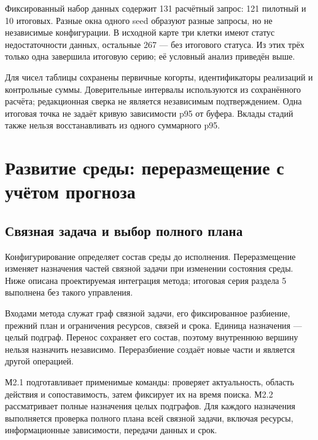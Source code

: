 Фиксированный набор данных содержит 131 расчётный запрос: 121 пилотный и 10 итоговых. Разные окна одного seed образуют разные запросы, но не независимые конфигурации. В исходной карте три клетки имеют статус недостаточности данных, остальные 267 --- без итогового статуса. Из этих трёх только одна завершила итоговую серию; её условный анализ приведён выше.

Для чисел таблицы \hyperlink{fefc-tab:3}{} сохранены первичные когорты, идентификаторы реализаций и контрольные суммы. Доверительные интервалы используются из сохранённого расчёта; редакционная сверка не является независимым подтверждением. Одна итоговая точка не задаёт кривую зависимости p95 от буфера. Вклады стадий также нельзя восстанавливать из одного суммарного p95.

\hypertarget{ux440ux430ux437ux432ux438ux442ux438ux435-ux441ux440ux435ux434ux44b-ux43fux435ux440ux435ux440ux430ux437ux43cux435ux449ux435ux43dux438ux435-ux441-ux443ux447ux451ux442ux43eux43c-ux43fux440ux43eux433ux43dux43eux437ux430}{%
\section{Развитие среды: переразмещение с учётом прогноза}}

\hypertarget{ux441ux432ux44fux437ux43dux430ux44f-ux437ux430ux434ux430ux447ux430-ux438-ux432ux44bux431ux43eux440-ux43fux43eux43bux43dux43eux433ux43e-ux43fux43bux430ux43dux430}{%
\subsection{Связная задача и выбор полного плана}}

Конфигурирование определяет состав среды до исполнения. Переразмещение изменяет назначения частей связной задачи при изменении состояния среды. Ниже описана проектируемая интеграция метода; итоговая серия раздела 5 выполнена без такого управления.

Входами метода служат граф связной задачи, его фиксированное разбиение, прежний план и ограничения ресурсов, связей и срока. Единица назначения --- целый подграф. Перенос сохраняет его состав, поэтому внутреннюю вершину нельзя назначить независимо. Переразбиение создаёт новые части и является другой операцией.

М2.1 подготавливает применимые команды: проверяет актуальность, область действия и сопоставимость, затем фиксирует их на время поиска. М2.2 рассматривает полные назначения целых подграфов. Для каждого назначения выполняется проверка полного плана всей связной задачи, включая ресурсы, информационные зависимости, передачи данных и срок.

